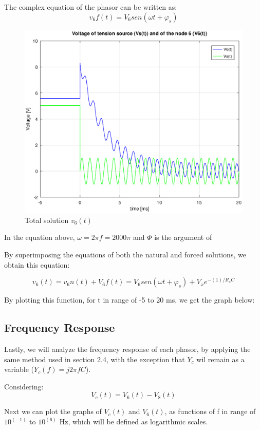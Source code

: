 The complex equation of the phasor can be written as:
\begin{equation}
	v_6f(t) = V_6sen(\omega t + \varphi_s)
\end{equation}

\begin{figure}[h!] \centering
\includegraphics[width=0.6\linewidth]{forced_solution.eps}
\caption{Total solution $v_6(t)$}
\label{fig:rc2}
\end{figure}


In the equation above, $\omega = 2\pi f = 2000\pi$ and $\varPhi$ is the argument of 

By superimposing the equations of both the natural and forced solutions, we obtain this equation:

\begin{equation}
	v_6(t) = v_6n(t) + V_6f(t) = V_6sen(\omega t + \varphi_s) + V_xe^{-(1)/R_sC}
\end{equation}

By plotting this function, for t in range of -5 to 20 ms, we get the graph below:



\subsection{Frequency Response}

Lastly, we will analyze the frequency response of each phasor, by applying the same method used in section 2.4, with the exception that $Y_c$ wil remain as a variable ($Y_c(f) = j2\pi fC$).

Considering:
\begin{equation}
	V_c(t) = V_6(t) - V_8(t)
\end{equation} 

Next we can plot the graphs of $V_c(t)$ and $V_6(t)$, as functions of f in range of $10^(-1)$ to $10^(6)$ Hz, which will be defined as logarithmic scales.

